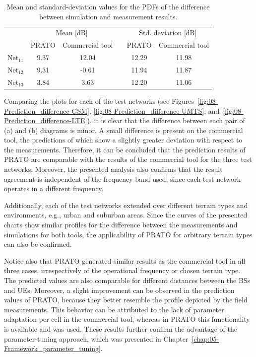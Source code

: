 \begin{table}
\centering

\caption{Mean and standard-deviation values for the PDFs of the difference
between simulation and measurement results.\textit{\emph{ }}\textit{\label{tab:08-PDF_properties}}}


\begin{tabular}{cccccc}
\cmidrule{2-6} 
 & \multicolumn{2}{c}{Mean {[}dB{]}} &  & \multicolumn{2}{c}{Std. deviation {[}dB{]}}\tabularnewline\addlinespace
\cmidrule{2-6} 
 & PRATO & Commercial tool &  & PRATO & Commercial tool\tabularnewline\addlinespace
\midrule
Net$_{11}$ & 9.37 & 12.04 &  & 12.29 & 11.98\tabularnewline
Net$_{12}$ & 9.31 & -0.61 &  & 11.94 & 11.87\tabularnewline
Net$_{13}$ & 3.84 & 3.63 &  & 12.20 & 11.06\tabularnewline
\bottomrule
\end{tabular}
\end{table}


Comparing the plots for each of the test networks (see Figures~\ref{fig:08-Prediction_difference-GSM},
\ref{fig:08-Prediction_difference-UMTS}, and~\ref{fig:08-Prediction_difference-LTE}),
it is clear that the difference between each pair of (a) and (b) diagrams
is minor. A small difference is present on the commercial tool, the
predictions of which show a slightly greater deviation with respect
to the measurements. Therefore, it can be concluded that the prediction
results of PRATO are comparable with the results of the commercial
tool for the three test networks. Moreover, the presented analysis
also confirms that the result agreement is independent of the frequency
band used, since each test network operates in a different frequency.

Additionally, each of the test networks extended over different terrain
types and environments, e.g., urban and suburban areas. Since the
curves of the presented charts show similar profiles for the difference
between the measurements and simulations for both tools, the applicability
of PRATO for arbitrary terrain types can also be confirmed.

Notice also that PRATO generated similar results as the commercial
tool in all three cases, irrespectively of the operational frequency
or chosen terrain type. The predicted values are also comparable for
different distances between the BSs and UEs. Moreover, a slight improvement
can be observed in the prediction values of PRATO, because they better
resemble the profile depicted by the field measurements. This behavior
can be attributed to the lack of parameter adaptation per cell in
the commercial tool, whereas in PRATO this functionality is available
and was used. These results further confirm the advantage of the parameter-tuning
approach, which was presented in Chapter~\ref{chap:05-Framework_parameter_tuning}.


